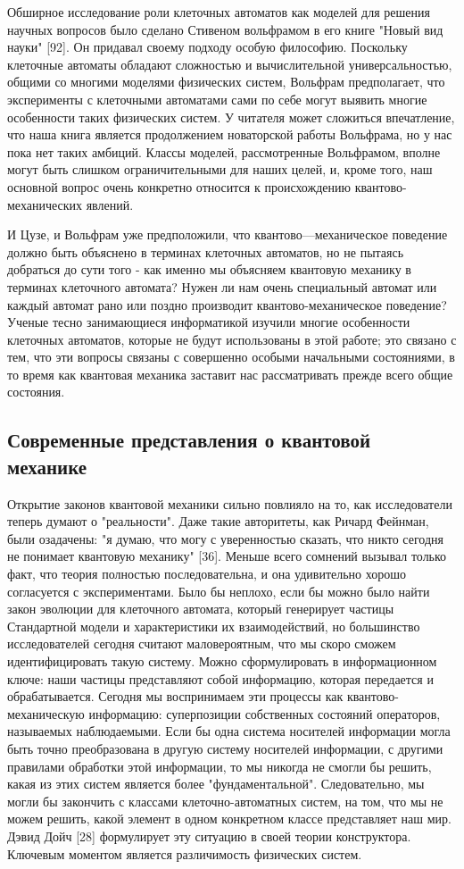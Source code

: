 \documentclass[main.tex]{subfiles}
\begin{document}
Обширное исследование роли клеточных автоматов как моделей для решения научных вопросов было сделано Стивеном вольфрамом в его книге "Новый вид науки" [92]. Он придавал своему подходу особую философию. Поскольку клеточные автоматы обладают сложностью и вычислительной универсальностью, общими со многими моделями физических систем, Вольфрам предполагает, что эксперименты с клеточными автоматами сами по себе могут выявить многие особенности таких физических систем. У читателя может сложиться впечатление, что наша книга является продолжением новаторской работы Вольфрама, но у нас пока нет таких амбиций. Классы моделей, рассмотренные Вольфрамом, вполне могут быть слишком ограничительными для наших целей, и, кроме того, наш основной вопрос очень конкретно относится к происхождению квантово-механических явлений. 

И Цузе, и Вольфрам уже предположили, что квантово—механическое поведение должно быть объяснено в терминах клеточных автоматов, но не пытаясь добраться до сути того - как именно мы объясняем квантовую механику в терминах клеточного автомата? Нужен ли нам очень специальный автомат или каждый автомат рано или поздно производит квантово-механическое поведение? Ученые тесно занимающиеся информатикой изучили многие особенности клеточных автоматов, которые не будут использованы в этой работе; это связано с тем, что эти вопросы связаны с совершенно особыми начальными состояниями, в то время как квантовая механика заставит нас рассматривать прежде всего общие состояния.

\subsection{Современные представления о квантовой механике}\label{ch1.5}

Открытие законов квантовой механики сильно повлияло на то, как исследователи теперь думают о "реальности". Даже такие авторитеты, как Ричард Фейнман, были озадачены: "я думаю, что могу с уверенностью сказать, что никто сегодня не понимает квантовую механику" [36]. Меньше всего сомнений вызывал только факт, что теория полностью последовательна, и она удивительно хорошо согласуется с экспериментами. Было бы неплохо, если бы можно было найти закон эволюции для клеточного автомата, который генерирует частицы Стандартной модели и характеристики их взаимодействий, но большинство исследователей сегодня считают маловероятным, что мы скоро сможем идентифицировать такую систему. Можно сформулировать в информационном ключе: наши частицы представляют собой информацию, которая передается и обрабатывается. Сегодня мы воспринимаем эти процессы как квантово-механическую информацию: суперпозиции собственных состояний операторов, называемых наблюдаемыми. Если бы одна система носителей информации могла быть точно преобразована в другую систему носителей информации, с другими правилами обработки этой информации, то мы никогда не смогли бы решить, какая из этих систем является более "фундаментальной". Следовательно, мы могли бы закончить с классами клеточно-автоматных систем, на том, что мы не можем решить, какой элемент в одном конкретном классе представляет наш мир. Дэвид Дойч [28] формулирует эту ситуацию в своей теории конструктора. Ключевым моментом является различимость физических систем. 
\end{document}
